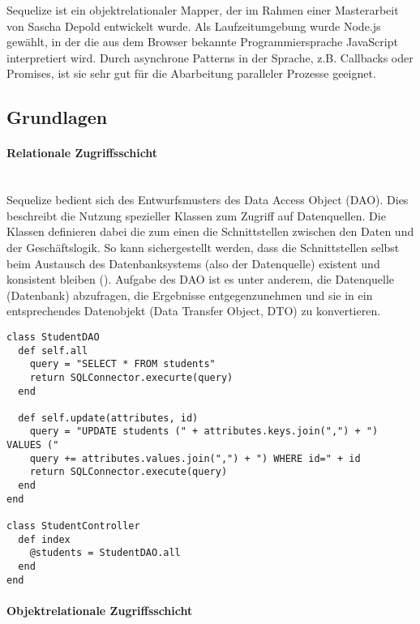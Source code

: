 
Sequelize ist ein objektrelationaler Mapper, der im Rahmen einer Masterarbeit von Sascha Depold entwickelt wurde. Als Laufzeitumgebung wurde Node.js gewählt, in der die aus dem Browser bekannte Programmiersprache JavaScript interpretiert wird. Durch asynchrone Patterns in der Sprache, z.B. Callbacks oder Promises, ist sie sehr gut für die Abarbeitung paralleler Prozesse geeignet.

\subsection{Grundlagen}

\paragraph{Relationale Zugriffsschicht} \hspace{0pt} \\
Sequelize bedient sich des Entwurfsmusters des Data Access Object (DAO). Dies beschreibt die Nutzung spezieller Klassen zum Zugriff auf Datenquellen. Die Klassen definieren dabei die zum einen die Schnittstellen zwischen den Daten und der Geschäftslogik. So kann sichergestellt werden, dass die Schnittstellen selbst beim Austausch des Datenbanksystems (also der Datenquelle) existent und konsistent bleiben (\cite[S. 8]{Depo1}). Aufgabe des DAO ist es unter anderem, die Datenquelle (Datenbank) abzufragen, die Ergebnisse entgegenzunehmen und sie in ein entsprechendes Datenobjekt (Data Transfer Object, DTO) zu konvertieren.

\begin{lstlisting}[caption=Relationale Zugriffsschicht]
class StudentDAO
  def self.all
    query = "SELECT * FROM students"
    return SQLConnector.execurte(query)
  end
  
  def self.update(attributes, id)
    query = "UPDATE students (" + attributes.keys.join(",") + ") VALUES ("
    query += attributes.values.join(",") + ") WHERE id=" + id
    return SQLConnector.execute(query)
  end
end

class StudentController
  def index
    @students = StudentDAO.all
  end
end
\end{lstlisting}


\paragraph{Objektrelationale Zugriffsschicht} \hspace{0pt} \\

